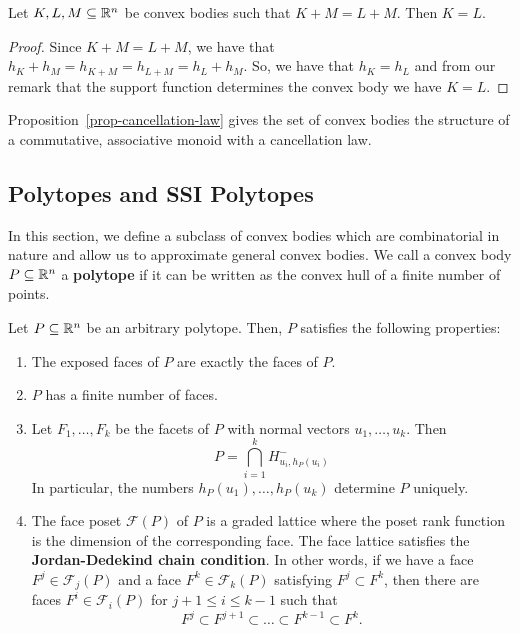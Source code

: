 \documentclass{puthesis-UG}
\begin{document}
\begin{prop}  \label{prop-cancellation-law}
	Let $K, L, M \subseteq \mathbb{R}^n$ be convex bodies such that $K+M = L+M$. Then $K = L$. 
\end{prop}

\begin{proof}
	Since $K+M = L+M$, we have that $h_K + h_M = h_{K+M} = h_{L+M} = h_L + h_M$. So, we have that $h_K = h_L$ and from our remark that the support function determines the convex body we have $K = L$.
\end{proof}

Proposition~\ref{prop-cancellation-law} gives the set of convex bodies the structure of a commutative, associative monoid with a cancellation law. 


\subsection{Polytopes and SSI Polytopes }

In this section, we define a subclass of convex bodies which are combinatorial in nature and allow us to approximate general convex bodies. We call a convex body $P \subseteq \mathbb{R}^n$ a \textbf{polytope} if it can be written as the convex hull of a finite number of points. 

\begin{prop}
	Let $P \subseteq \mathbb{R}^n$ be an arbitrary polytope. Then, $P$ satisfies the following properties: 
	\begin{enumerate}[label = (\alph*)]
		\item The exposed faces of $P$ are exactly the faces of $P$. 
		\item $P$ has a finite number of faces. 
		\item Let $F_1, \ldots, F_k$ be the facets of $P$ with normal vectors $u_1, \ldots, u_k$. Then 
		\[
			P = \bigcap_{i = 1}^k H_{u_i, h_P(u_i)}^-
		\]
		In particular, the numbers $h_P(u_1), \ldots, h_P(u_k)$ determine $P$ uniquely. 

		\item The face poset $\mathcal{F}(P)$ of $P$ is a graded lattice where the poset rank function is the dimension of the corresponding face. The face lattice satisfies the \textbf{Jordan-Dedekind chain condition}. In other words, if we have a face $F^j \in \mathcal{F}_j(P)$ and a face $F^k \in \mathcal{F}_k(P)$ satisfying $F^j \subset F^k$, then there are faces $F^i \in \mathcal{F}_i(P)$ for $j+1 \leq i \leq k-1$ such that 
		\[
			F^j \subset F^{j+1} \subset \ldots \subset F^{k-1} \subset F^k.
		\]
	\end{enumerate}
\end{prop}
\end{document}
